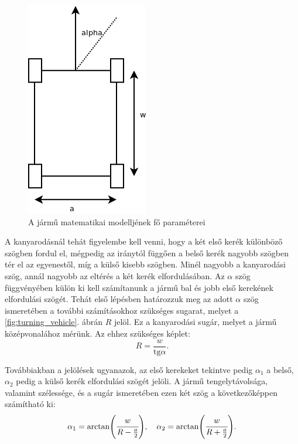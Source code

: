 \begin{figure}[h!]
\centering
\includegraphics[scale=0.45]{images/vehicle.png}
\caption{A jármű matematikai modelljének fő paraméterei}
\label{fig:vehicle}
\end{figure}


A kanyarodásnál tehát figyelembe kell venni, hogy a két első kerék különböző szögben fordul el, mégpedig az iránytól függően a belső kerék nagyobb szögben tér el az egyenestől, míg a külső kisebb szögben. Minél nagyobb a kanyarodási szög, annál nagyobb az eltérés a két kerék elfordulásában.
Az $\alpha$ szög függvényében külön ki kell számítanunk a jármű bal és jobb első kerekének elfordulási szögét.
Tehát első lépésben határozzuk meg az adott $\alpha$ szög ismeretében a további számításokhoz szükséges sugarat,
melyet a \ref{fig:turning_vehicle}. ábrán $R$ jelöl. Ez a kanyarodási sugár, melyet a jármű középvonalához mérünk.
Az ehhez szükséges képlet:
\[
R = \dfrac{w}{\text{tg} \alpha}.
\]

Továbbiakban a jelölések ugyanazok, az első kerekeket tekintve pedig $\alpha_1$ a belső, $\alpha_2$ pedig a külső kerék elfordulási szögét jelöli.  
A jármű tengelytávolsága, valamint szélessége, és a sugár ismeretében ezen két szög a következőképpen számítható ki:
\[
\alpha\textsubscript{1} =
\text{arctan}\Bigg(\cfrac{w}{R-\frac{a}{2}}\Bigg),
\quad
\alpha\textsubscript{2} =
\text{arctan}\Bigg(\cfrac{w}{R+\frac{a}{2}}\Bigg).
\]


